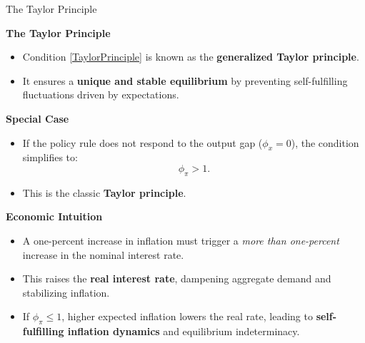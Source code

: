 \documentclass[11pt,aspectratio=169]{beamer}
\begin{document}
\begin{frame}{The Taylor Principle}
\small

\textbf{The Taylor Principle}
\begin{itemize}
    \item Condition \eqref{TaylorPrinciple} is known as the \textbf{generalized Taylor principle}.
    \item It ensures a \textbf{unique and stable equilibrium} by preventing self-fulfilling fluctuations driven by expectations.
\end{itemize}

\vspace{0.1cm}

\textbf{Special Case}
\begin{itemize}
    \item If the policy rule does not respond to the output gap ($\phi_x = 0$), the condition simplifies to:
    \[
    \phi_\pi > 1.
    \]
    \item This is the classic \textbf{Taylor principle}.
\end{itemize}

\vspace{0.1cm}

\textbf{Economic Intuition}
\begin{itemize}
    \item A one-percent increase in inflation must trigger a \emph{more than one-percent} increase in the nominal interest rate.
    \item This raises the \textbf{real interest rate}, dampening aggregate demand and stabilizing inflation.
    \item If $\phi_\pi \le 1$, higher expected inflation lowers the real rate, leading to \textbf{self-fulfilling inflation dynamics} and equilibrium indeterminacy.
\end{itemize}

\end{frame}
\end{document}
